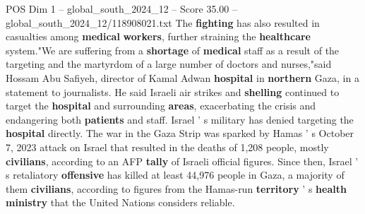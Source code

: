 \begin{textsample}{POS Dim 1 – global\_south\_2024\_12 – Score 35.00 – global\_south\_2024\_12/118908021.txt}
The \textbf{fighting} has also resulted in casualties among \textbf{medical} \textbf{workers}, further straining the \textbf{healthcare} system."We are suffering from a \textbf{shortage} of \textbf{medical} staff as a result of the targeting and the martyrdom of a large number of doctors and nurses,"said Hossam Abu Safiyeh, director of Kamal Adwan \textbf{hospital} in \textbf{northern} Gaza, in a statement to journalists.
He said Israeli air strikes and \textbf{shelling} continued to target the \textbf{hospital} and surrounding \textbf{areas}, exacerbating the crisis and endangering both \textbf{patients} and staff.
Israel ' s military has denied targeting the \textbf{hospital} directly.
The war in the Gaza Strip was sparked by Hamas ' s October 7, 2023 attack on Israel that resulted in the deaths of 1,208 people, mostly \textbf{civilians}, according to an AFP \textbf{tally} of Israeli official figures.
Since then, Israel ' s retaliatory \textbf{offensive} has killed at least 44,976 people in Gaza, a majority of them \textbf{civilians}, according to figures from the Hamas-run \textbf{territory} ' s \textbf{health} \textbf{ministry} that the United Nations considers reliable.

\end{textsample}
